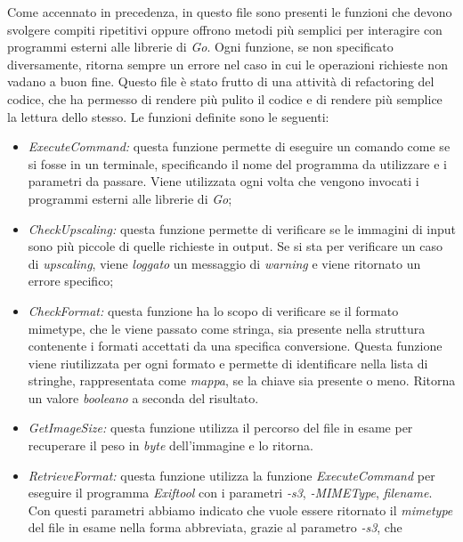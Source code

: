Come accennato in precedenza, in questo file sono presenti le funzioni che devono svolgere compiti ripetitivi
oppure offrono metodi più semplici per interagire con programmi esterni alle
librerie di \emph{Go}. Ogni
funzione, se non specificato diversamente, ritorna sempre un errore nel caso in
cui le operazioni richieste non vadano a buon fine. Questo file è stato frutto
di una attività di \glsfirstoccur\gls{refactoring} del codice, che ha permesso
di
rendere più pulito il codice e di rendere più semplice la lettura dello stesso.
Le funzioni definite sono le seguenti:
\begin{itemize}
      \item \emph{ExecuteCommand:} questa funzione permette di eseguire un
            comando come se si fosse in un terminale, specificando il nome del
            programma da utilizzare e i parametri da passare. Viene utilizzata ogni
            volta che vengono invocati i programmi esterni alle librerie di \emph{Go};
      \item \emph{CheckUpscaling:} questa funzione permette di verificare se le
            immagini di input sono più piccole di quelle richieste in output. Se
            si sta per verificare un caso di \emph{upscaling}, viene
            \emph{loggato} un messaggio di \emph{warning} e viene ritornato un
            errore specifico;
      \item \emph{CheckFormat:} questa funzione ha lo scopo di verificare se il
            formato \glsfirstoccur\gls{mimetype}, che le viene passato come
            stringa, sia presente nella struttura contenente i formati accettati
            da una specifica conversione. Questa funzione viene riutilizzata per
            ogni formato e permette di identificare nella lista di stringhe,
            rappresentata come \emph{mappa}, se la chiave sia presente o meno.
            Ritorna un valore \emph{booleano} a seconda del risultato.
      \item \emph{GetImageSize:} questa funzione utilizza il percorso del file in
            esame per recuperare il peso in \emph{byte} dell'immagine e lo ritorna.
      \item \emph{RetrieveFormat:} questa funzione utilizza la funzione
            \emph{ExecuteCommand} per eseguire il programma \emph{Exiftool} con i
            parametri \emph{-s3}, \emph{-MIMEType}, \emph{filename}. Con questi
            parametri abbiamo indicato che vuole essere ritornato il \emph{mimetype} del
            file in esame nella forma abbreviata, grazie al parametro \emph{-s3}, che

\end{itemize}
